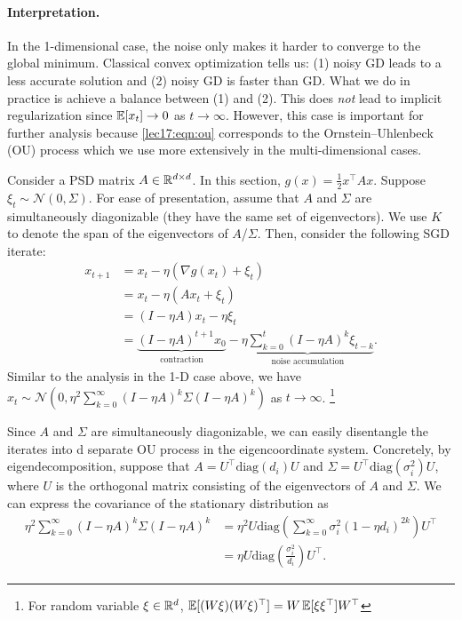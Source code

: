 \paragraph{Interpretation.} In the 1-dimensional case, the noise only makes it harder to converge to the global minimum. Classical convex optimization tells us: (1) noisy GD leads to a less accurate solution and (2) noisy GD is faster than GD. What we do in practice is achieve a balance between (1) and (2). This does \textit{not} lead to implicit regularization since $\operatorname*{\mathbb{E}}[x_t] \rightarrow 0$ as $t \rightarrow \infty$. However, this case is important for further analysis because \eqref{lec17:eqn:ou} corresponds to the Ornstein–Uhlenbeck (OU) process which we use more extensively in the multi-dimensional cases.

Consider a PSD matrix $A \in \mathbb R^{d\times d}$. In this section, $g(x) = \frac{1}{2}x^\top A x$. Suppose $\xi_t \sim \mathcal{N}(0, \Sigma)$. For ease of presentation, assume that $A$ and $\Sigma$ are simultaneously diagonizable (they have the same set of eigenvectors). We use $K$ to denote the span of the eigenvectors of $A$/$\Sigma$. Then, consider the following SGD iterate:
\begin{align}
x_{t+1} &= x_t - \eta(\nabla g(x_{t}) + \xi_t)\\
&= x_t - \eta(Ax_t + \xi_t)\\
&= (I- \eta A)x_t - \eta\xi_t\\
&= \underbrace{(I- \eta A)^{t+1} x_0}_{\text{contraction}} - \underbrace{\eta\sum_{k=0}^{t} (I- \eta A)^{k}\xi_{t-k}}_{\text{noise accumulation}}.
\end{align}
Similar to the analysis in the 1-D case above, we have $x_t \sim \mathcal{N}(0, \eta^2\sum_{k=0}^{\infty} (I- \eta A)^{k}\Sigma (I- \eta A)^{k})$ as $t \rightarrow \infty$. \footnote{For random variable $\xi\in \mathbb R^d$, $\operatorname*{\mathbb{E}}[(W\xi)(W\xi)^\top] = W\operatorname*{\mathbb{E}}[\xi\xi^\top]W^\top$}

Since $A$ and $\Sigma$ are simultaneously diagonizable, we can easily disentangle the iterates into d separate OU process in the eigencoordinate system. Concretely, by eigendecomposition, suppose that $A = U^\top \text{diag}(d_i) U$ and $\Sigma = U^\top \text{diag}(\sigma_i^2) U$, where $U$ is the orthogonal matrix consisting of the eigenvectors of $A$ and $\Sigma$. We can express the covariance of the stationary distribution as
\begin{align}
\eta^2\sum_{k=0}^{\infty} (I- \eta A)^{k}\Sigma (I- \eta A)^{k} &= \eta^2 U\text{diag}\left(\sum_{k=0}^{\infty}\sigma_i^2(1-\eta d_i)^{2k}\right)U^\top\\
&= \eta U\text{diag}\left(\frac{\sigma_i^2}{d_i}\right)U^\top.
\end{align}
